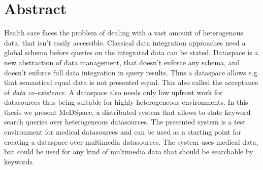 \chapter*{Abstract}

Health care faces the problem of dealing with a vast amount of heterogenous data, that isn't easily accessible. Classical data integration approaches need a global schema before queries on the integrated data can be stated. Dataspace is a new abstraction of data management, that doesn't enforce any schema, and doesn't enforce full data integration in query results. Thus a dataspace allows e.g. that semantical equal data is not presented equal. This also called the acceptance of \emph{data co-existence}. A dataspace also needs only low upfront work for datasources thus being suitable for highly heterogeneous environments. In this thesis we present MeDSpace, a distributed system that allows to state keyword search queries over heterogeneous datasources. The presented system is a test environment for medical datasources and can be used as a starting point for creating a dataspace over multimedia datasources. The system uses medical data, but could be used for any kind of multimedia data that should be searchable by keywords.